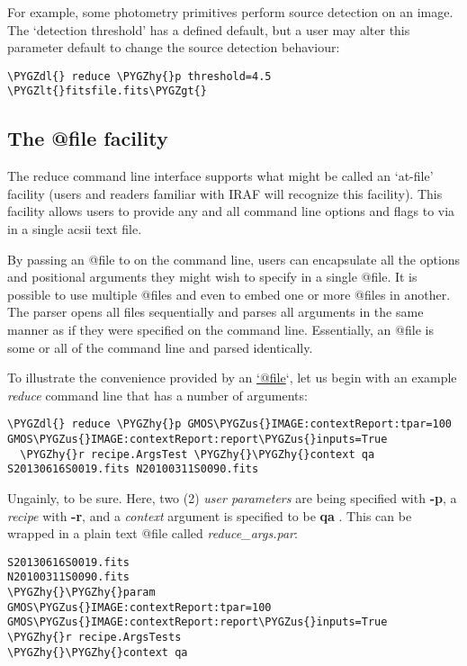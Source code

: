 \documentclass[letterpaper,10pt,english]{sphinxmanual}
\def\PYGZus{\char`\_}
\def\PYGZlt{\char`\<}
\def\PYGZgt{\char`\>}
\def\PYGZdl{\char`\$}
\def\PYGZhy{\char`\-}
\begin{document}
For example, some photometry primitives perform source detection on an image.
The `detection threshold' has a defined default, but a user may alter this
parameter default to change the source detection behaviour:

\begin{Verbatim}[commandchars=\\\{\}]
\PYGZdl{} reduce \PYGZhy{}p threshold=4.5 \PYGZlt{}fitsfile.fits\PYGZgt{}
\end{Verbatim}


\subsection{The @file facility}
\label{interfaces:the-file-facility}\label{interfaces:atfile}
The reduce command line interface supports what might be called an `at-file'
facility (users and readers familiar with IRAF will recognize this facility).
This facility allows users to provide any and all command line options and flags
to  via in a single acsii text file.

By passing an @file to  on the command line, users can encapsulate all
the options and positional arguments they might wish to specify in a single
@file. It is possible to use multiple @files and even to embed one or more
@files in another. The parser opens all files sequentially and parses
all arguments in the same manner as if they were specified on the command line.
Essentially, an @file is some or all of the command line and parsed identically.

To illustrate the convenience provided by an \href{mailto:'@file}{`@file}`, let us begin with an
example \emph{reduce} command line that has a number of arguments:

\begin{Verbatim}[commandchars=\\\{\}]
\PYGZdl{} reduce \PYGZhy{}p GMOS\PYGZus{}IMAGE:contextReport:tpar=100 GMOS\PYGZus{}IMAGE:contextReport:report\PYGZus{}inputs=True
  \PYGZhy{}r recipe.ArgsTest \PYGZhy{}\PYGZhy{}context qa S20130616S0019.fits N20100311S0090.fits
\end{Verbatim}

Ungainly, to be sure. Here, two (2) \emph{user parameters} are being specified
with \textbf{-p}, a \emph{recipe} with \textbf{-r}, and a \emph{context} argument is specified
to be \textbf{qa} . This can be wrapped in a plain text @file called
\emph{reduce\_args.par}:

\begin{Verbatim}[commandchars=\\\{\}]
S20130616S0019.fits
N20100311S0090.fits
\PYGZhy{}\PYGZhy{}param
GMOS\PYGZus{}IMAGE:contextReport:tpar=100
GMOS\PYGZus{}IMAGE:contextReport:report\PYGZus{}inputs=True
\PYGZhy{}r recipe.ArgsTests
\PYGZhy{}\PYGZhy{}context qa
\end{Verbatim}
\end{document}
